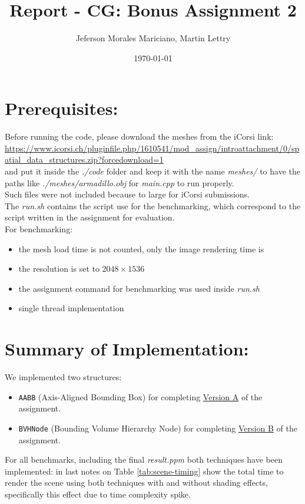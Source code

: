 \documentclass{article}
\title{Report - CG: Bonus Assignment 2}
\author{Jeferson Morales Mariciano, Martin Lettry}
\date{\today}
\begin{document}
\maketitle

\section*{Prerequisites:}
Before running the code, please download the meshes from the iCorsi link:\\
\url{https://www.icorsi.ch/pluginfile.php/1610541/mod_assign/introattachment/0/spatial_data_structures.zip?forcedownload=1}\\
and put it inside the \textit{./code} folder and keep it with the name \textit{meshes/} to have the paths
like \textit{./meshes/armadillo.obj} for \textit{main.cpp} to run properly.\\
Such files were not included because to large for iCorsi submissions.\\

The \textit{run.sh} contains the script use for the benchmarking, which correspond to the script written in the assignment
for evaluation.\\
For benchmarking:
\begin{itemize}
  \item the mesh load time is not counted, only the image rendering time is
  \item the resolution is set to $2048 \times 1536$
  \item the assignment command for benchmarking was used inside \textit{run.sh}
  \item single thread implementation
\end{itemize}


\section*{Summary of Implementation:}
We implemented two structures:
\begin{itemize}
  \item \texttt{AABB} (Axis-Aligned Bounding Box) for completing \underline{Version A} of the assignment.
  \item \texttt{BVHNode} (Bounding Volume Hierarchy Node) for completing \underline{Version B} of the assignment.
\end{itemize}

For all benchmarks, including the final \textit{result.ppm} both techniques have been implemented:
in last notes on Table \ref{tab:scene-timing} show the total time to render the scene using both techniques
with and without shading effects, specifically this effect due to time complexity spike.\\
\end{document}
